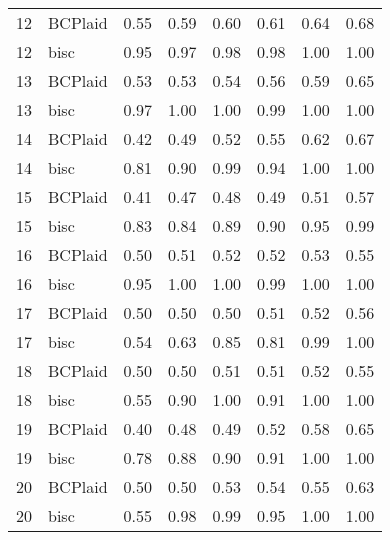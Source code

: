 \begin{table}[ht]
\begin{tabular}{rlrrrrrr}
   12 & BCPlaid & 0.55 & 0.59 & 0.60 & 0.61 & 0.64 & 0.68 \\ 
   12 & bisc & 0.95 & 0.97 & 0.98 & 0.98 & 1.00 & 1.00 \\ 
   13 & BCPlaid & 0.53 & 0.53 & 0.54 & 0.56 & 0.59 & 0.65 \\ 
   13 & bisc & 0.97 & 1.00 & 1.00 & 0.99 & 1.00 & 1.00 \\ 
   14 & BCPlaid & 0.42 & 0.49 & 0.52 & 0.55 & 0.62 & 0.67 \\ 
   14 & bisc & 0.81 & 0.90 & 0.99 & 0.94 & 1.00 & 1.00 \\ 
   15 & BCPlaid & 0.41 & 0.47 & 0.48 & 0.49 & 0.51 & 0.57 \\ 
   15 & bisc & 0.83 & 0.84 & 0.89 & 0.90 & 0.95 & 0.99 \\ 
   16 & BCPlaid & 0.50 & 0.51 & 0.52 & 0.52 & 0.53 & 0.55 \\ 
   16 & bisc & 0.95 & 1.00 & 1.00 & 0.99 & 1.00 & 1.00 \\ 
   17 & BCPlaid & 0.50 & 0.50 & 0.50 & 0.51 & 0.52 & 0.56 \\ 
   17 & bisc & 0.54 & 0.63 & 0.85 & 0.81 & 0.99 & 1.00 \\ 
   18 & BCPlaid & 0.50 & 0.50 & 0.51 & 0.51 & 0.52 & 0.55 \\ 
   18 & bisc & 0.55 & 0.90 & 1.00 & 0.91 & 1.00 & 1.00 \\ 
   19 & BCPlaid & 0.40 & 0.48 & 0.49 & 0.52 & 0.58 & 0.65 \\ 
   19 & bisc & 0.78 & 0.88 & 0.90 & 0.91 & 1.00 & 1.00 \\ 
   20 & BCPlaid & 0.50 & 0.50 & 0.53 & 0.54 & 0.55 & 0.63 \\ 
   20 & bisc & 0.55 & 0.98 & 0.99 & 0.95 & 1.00 & 1.00 \\ 
   \bottomrule
\end{tabular}
\end{table}
